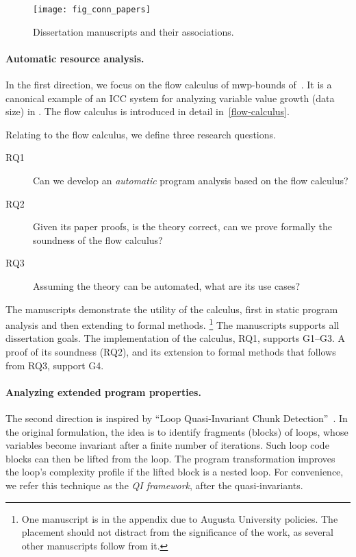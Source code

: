 \begin{figure}[p]
\texttt{[image: fig\_conn\_papers]}\vspace{1em}
\caption[Dissertation manuscripts and their associations]
{Dissertation manuscripts and their associations.}
\label{fig:conn_papers}
\end{figure}

\paragraph*{Automatic resource analysis.}

In the first direction, we focus on the flow calculus of mwp-bounds
of~\textcite{jones2009}. It is a canonical example of an ICC system for
analyzing variable value growth (data size) in . The
flow calculus is introduced in detail in~\autoref{flow-calculus}.

Relating to the flow calculus, we define three research questions.
\begin{description}
\item[RQ1] Can we develop an \emph{automatic} program analysis based on the flow calculus?
\item[RQ2] Given its paper proofs, is the theory correct, \ie can we prove formally the soundness of the flow calculus?
\item[RQ3] Assuming the theory can be automated, what are its use cases?
\end{description}

The manuscripts demonstrate the utility of the calculus, first in static program
analysis and then extending to formal methods.%
\footnote{One manuscript is in the appendix due to Augusta University policies.
The placement should not distract from the significance of the work, as several
other manuscripts follow from it.} The manuscripts supports all dissertation
goals. The implementation of the calculus, RQ1, supports G1--G3. A proof of its
soundness (RQ2), and its extension to formal methods that follows from RQ3,
support G4.

\paragraph*{Analyzing extended program properties.}

The second direction is inspired by \enquote{Loop Quasi-Invariant Chunk
Detection}~\cite{moyen20172}. In the original formulation, the idea is to
identify fragments (blocks) of loops, whose variables become invariant after a
finite number of iterations. Such loop  code blocks can
then be lifted from the loop. The program transformation improves the loop's
complexity profile if the lifted block is a nested loop. For convenience, we
refer this technique as the \emph{QI framework}, after the quasi-invariants.


